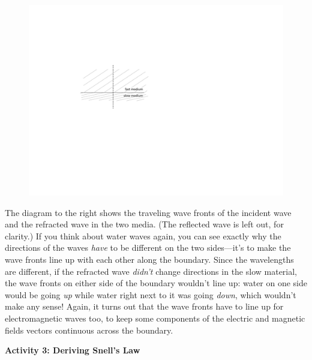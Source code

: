 \begin{figure}
\begin{flushright}
\vspace{-0.2in}
{\includegraphics{deriving_snells_law/wave_fronts.pdf}}
\end{flushright}
\end{figure}

The diagram to the right shows the traveling wave fronts of the incident wave and the refracted wave in the two media.  (The reflected wave is left out, for clarity.)  If you think about water waves again, you can see exactly why the directions of the waves \textit{have} to be different on the two sides---it's to make the wave fronts line up with each other along the boundary.  Since the wavelengths are different, if the refracted wave \textit{didn't} change directions in the slow material, the wave fronts on either side of the boundary wouldn't line up: water on one side would be going \textit{up} while water right next to it was going \textit{down}, which wouldn't make any sense!  Again, it turns out that the wave fronts have to line up for electromagnetic waves too, to keep some components of the electric and magnetic fields vectors continuous across the boundary.

\bigskip
\textbf{Activity 3: Deriving Snell's Law}

